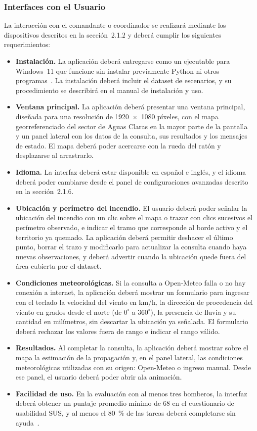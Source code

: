 \subsubsection{Interfaces con el Usuario}
La interacción con el comandante o coordinador se realizará mediante los dispositivos descritos en la sección~2.1.2 y deberá cumplir los siguientes requerimientos:

\begin{itemize}
  \item \textbf{Instalación.} La aplicación deberá entregarse como un ejecutable para Windows~11 que funcione sin instalar previamente Python ni otros programas~\cite{pmp2026}. La instalación deberá incluir \textcolor{black}{el dataset de escenarios}, y su procedimiento se describirá en el manual de instalación y uso.
  \item \textbf{Ventana principal.} La aplicación deberá presentar una ventana principal, diseñada para una resolución de 1920~$\times$~1080 píxeles, con el mapa georreferenciado del sector de Aguas Claras en la mayor parte de la pantalla y un panel lateral con los datos de la consulta, sus resultados y los mensajes de estado. El mapa deberá poder acercarse con la rueda del ratón y desplazarse al arrastrarlo.
  \item \textbf{Idioma.} La interfaz deberá estar disponible en español e inglés, y el idioma deberá poder cambiarse desde el panel de configuraciones avanzadas descrito en la sección~2.1.6.
  \item \textbf{Ubicación y perímetro del incendio.} El usuario deberá poder señalar la ubicación del incendio con un clic sobre el mapa o trazar con clics sucesivos el perímetro observado, e indicar el tramo que corresponde al borde activo y el territorio ya quemado. La aplicación deberá permitir deshacer el último punto, borrar el trazo y modificarlo para actualizar la consulta cuando haya nuevas observaciones, y deberá advertir cuando la ubicación quede fuera del área cubierta \textcolor{black}{por el dataset}.
  \item \textbf{Condiciones meteorológicas.} Si la consulta a Open-Meteo falla o no hay conexión a internet, la aplicación deberá mostrar un formulario para ingresar con el teclado la velocidad del viento en km/h, la dirección de procedencia del viento en grados desde el norte (de $0^{\circ}$ a $360^{\circ}$), la presencia de lluvia y su cantidad en milímetros, sin descartar la ubicación ya señalada. El formulario deberá rechazar los valores fuera de rango e indicar el rango válido.
  \item \textbf{Resultados.} Al completar la consulta, la aplicación deberá mostrar sobre el mapa la estimación de la propagación y, en el panel lateral, las condiciones meteorológicas utilizadas con su origen: Open-Meteo o ingreso manual. Desde ese panel, el usuario deberá poder abrir ala animación.
  \item \textbf{Facilidad de uso.} En la evaluación con al menos tres bomberos, la interfaz deberá obtener un puntaje promedio mínimo de 68 en el cuestionario de usabilidad SUS, y al menos el 80~\% de las tareas deberá completarse sin ayuda~\cite{pmp2026}.
\end{itemize}